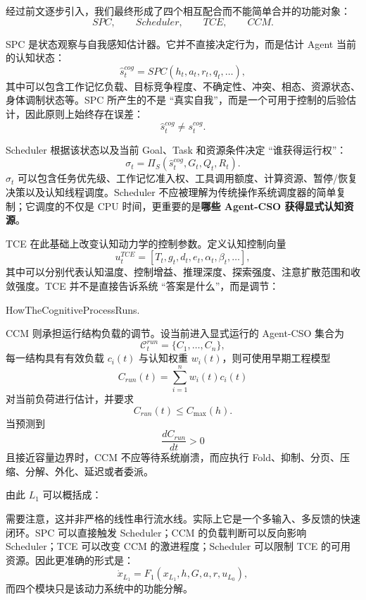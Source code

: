 经过前文逐步引入，我们最终形成了四个相互配合而不能简单合并的功能对象：
\[
SPC,\qquad Scheduler,\qquad TCE,\qquad CCM.
\]

SPC 是状态观察与自我感知估计器。它并不直接决定行为，而是估计 Agent 当前的认知状态：
\[
\hat{s}^{cog}_t
=
SPC
\left(
h_t,
a_t,
r_t,
q_t,
\ldots
\right),
\]
其中可以包含工作记忆负载、目标竞争程度、不确定性、冲突、相态、资源状态、身体调制状态等。SPC 所产生的不是 ``真实自我''，而是一个可用于控制的后验估计，因此原则上始终存在误差：
\[
\hat{s}^{cog}_t
\neq
s^{cog}_t.
\]

Scheduler 根据该状态以及当前 Goal、Task 和资源条件决定 ``谁获得运行权''：
\[
\sigma_t
=
\Pi_S
\left(
\hat{s}^{cog}_t,
G_t,
Q_t,
R_t
\right).
\]
$\sigma_t$ 可以包含任务优先级、工作记忆准入权、工具调用额度、计算资源、暂停/恢复决策以及认知线程调度。Scheduler 不应被理解为传统操作系统调度器的简单复制；它调度的不仅是 CPU 时间，更重要的是\textbf{哪些 Agent-CSO 获得显式认知资源}。

TCE 在此基础上改变认知动力学的控制参数。定义认知控制向量
\[
u^{TCE}_t
=
\left[
T_t,
g_t,
d_t,
e_t,
\alpha_t,
\beta_t,
\ldots
\right],
\]
其中可以分别代表认知温度、控制增益、推理深度、探索强度、注意扩散范围和收敛强度。TCE 并不是直接告诉系统 ``答案是什么''，而是调节：
\begin{statementbox}
HowTheCognitiveProcessRuns.
\end{statementbox}

CCM 则承担运行结构负载的调节。设当前进入显式运行的 Agent-CSO 集合为
\[
\mathcal{C}^{run}_t
=
\{C_1,\ldots,C_n\},
\]
每一结构具有有效负载 $c_i(t)$ 与认知权重 $w_i(t)$，则可使用早期工程模型
\[
C_{run}(t)
=
\sum_{i=1}^{n}
w_i(t)c_i(t)
\]
对当前负荷进行估计，并要求
\[
C_{run}(t)
\leq
C_{\max}(h).
\]
当预测到
\[
\frac{dC_{run}}{dt}>0
\]
且接近容量边界时，CCM 不应等待系统崩溃，而应执行 Fold、抑制、分页、压缩、分解、外化、延迟或者委派。

由此 $L_1$ 可以概括成：
\begin{statementbox}
\centering
{}
\end{statementbox}

需要注意，这并非严格的线性串行流水线。实际上它是一个多输入、多反馈的快速闭环。SPC 可以直接触发 Scheduler；CCM 的负载判断可以反向影响 Scheduler；TCE 可以改变 CCM 的激进程度；Scheduler 可以限制 TCE 的可用资源。因此更准确的形式是：
\[
\dot{x}_{L_1}
=
F_1
\left(
x_{L_1},
h,
G,
a,
r,
u_{L_0}
\right),
\]
而四个模块只是该动力系统中的功能分解。

